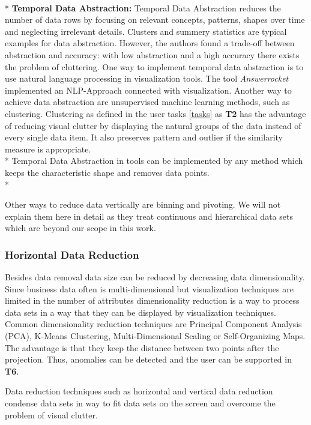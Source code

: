 \\*
\textbf{Temporal Data Abstraction: }
Temporal Data Abstraction\cite{Aigner2011} reduces the number of data rows by focusing on relevant concepts, patterns, shapes over time and neglecting irrelevant details. Clusters and summery statistics\cite{PiringerHarald2011} are typical examples for data abstraction. However, the authors found a trade-off between abstraction and accuracy: with low abstraction and a high accuracy there exists the problem of cluttering. 
One way to implement temporal data abstraction is to use natural language processing in visualization tools. The tool \textit{Answerrocket} implemented an NLP-Approach connected with visualization. Another way to achieve data abstraction are unsupervised machine learning methods, such as clustering.
Clustering as defined in the user tasks \ref{tasks} as \textbf{T2} has the advantage of reducing visual clutter by displaying the natural groups of the data instead of every single data item. It also preserves pattern and outlier if the similarity measure is appropriate.\\*
Temporal Data Abstraction in tools can be implemented by any method which keeps the characteristic shape and removes data points. \\*

Other ways to reduce data vertically are binning and pivoting. We will not explain them here in detail as they treat continuous and hierarchical data sets which are beyond our scope in this work. 

\subsubsection{Horizontal Data Reduction}
Besides data removal data size can be reduced by decreasing data dimensionality. Since business data often is multi-dimensional but visualization techniques are limited in the number of attributes dimensionality reduction is a way to process data sets in a way that they can be displayed by visualization techniques. 
Common dimensionality reduction techniques are Principal Component Analysis (PCA)\cite{Aigner2008}, K-Means Clustering\cite{AllenHamilton}, Multi-Dimensional Scaling or  Self-Organizing Maps\cite{PiringerHarald2011}. The advantage is that they keep the distance between two points after the projection. Thus, anomalies can be detected and the user can be supported in \textbf{T6}. 

Data reduction techniques such as horizontal and vertical data reduction condense  data sets in way to fit data sets on the screen and overcome the problem of visual clutter.

